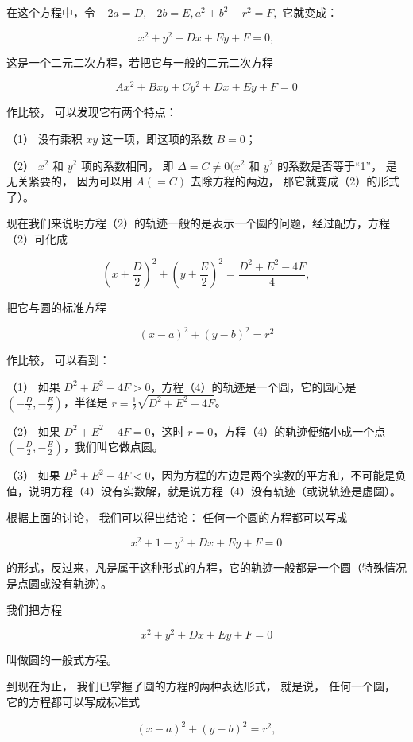 在这个方程中，令 \(-2a = D, -2b = E, a^2 + b^2 - r^2 = F,\) 它就变成：

\[
x^{2} + y^{2} + D x + E y + F = 0, \tag {2}
\]

这是一个二元二次方程，若把它与一般的二元二次方程

\[
A x^{2} + B x y + C y^{2} + D x + E y + F = 0 \tag {3}
\]

作比较， 可以发现它有两个特点：

（1） 没有乘积 \(xy\) 这一项，即这项的系数 \(B = 0\)；

（2） \(x^{2}\) 和 \(y^{2}\) 项的系数相同， 即
\(\Delta = C \neq 0 (x^{2}\) 和 \(y^{2}\) 的系数是否等于``1''，
是无关紧要的， 因为可以用 \(A (= C)\) 去除方程的两边，
那它就变成（2）的形式了）。

现在我们来说明方程（2）的轨迹一般的是表示一个圆的问题，经过配方，方程（2）可化成

\[
\left(x + \frac {D}{2}\right) ^ {2} + \left(y + \frac {E}{2}\right) ^ {2} = \frac {D^{2} + E^{2} - 4 F}{4}, \tag {4}
\]

把它与圆的标准方程

\[
(x - a) ^ {2} + (y - b) ^ {2} = r^{2}
\]

作比较， 可以看到：

（1） 如果
\(D^{2} + E^{2} - 4F > 0\)，方程（4）的轨迹是一个圆，它的圆心是
\(\left(-\frac{D}{2}, -\frac{E}{2}\right)\)，半径是
\(r = \frac{1}{2}\sqrt{D^{2} + E^{2} - 4F}\)。

（2） 如果 \(D^{2} + E^{2} - 4F = 0\)，这时
\(r = 0\)，方程（4）的轨迹便缩小成一个点
\(\left(-\frac{D}{2}, -\frac{E}{2}\right)\)，我们叫它做点圆。

（3） 如果
\(D^{2} + E^{2} - 4F < 0\)，因为方程的左边是两个实数的平方和，不可能是负值，说明方程（4）没有实数解，就是说方程（4）没有轨迹（或说轨迹是虚圆）。

根据上面的讨论， 我们可以得出结论： 任何一个圆的方程都可以写成

\[
x^{2} + 1 - y^{2} + D x + E y + F = 0
\]

的形式，反过来，凡是属于这种形式的方程，它的轨迹一般都是一个圆（特殊情况是点圆或没有轨迹）。

我们把方程

\[
x^{2} + y^{2} + D x + E y + F = 0
\]

叫做圆的一般式方程。

到现在为止， 我们已掌握了圆的方程的两种表达形式， 就是说， 任何一个圆，
它的方程都可以写成标准式

\[
(x - a) ^ {2} + (y - b) ^ {2} = r^{2},
\]

